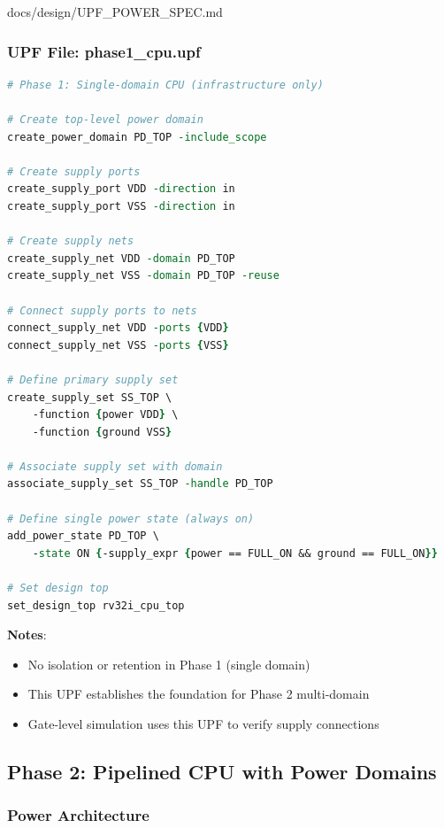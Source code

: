 \begin{relocated}{docs/design/UPF_POWER_SPEC.md}
\subsubsection{\texorpdfstring{UPF File:
phase1\_\allowbreak{}cpu.upf}{UPF File: phase1\_cpu.upf}}\label{ds:ch:upf-power-spec:upf-file-phase1-cpuupf}

\begin{lstlisting}[language=tcl]
# Phase 1: Single-domain CPU (infrastructure only)

# Create top-level power domain
create_power_domain PD_TOP -include_scope

# Create supply ports
create_supply_port VDD -direction in
create_supply_port VSS -direction in

# Create supply nets
create_supply_net VDD -domain PD_TOP
create_supply_net VSS -domain PD_TOP -reuse

# Connect supply ports to nets
connect_supply_net VDD -ports {VDD}
connect_supply_net VSS -ports {VSS}

# Define primary supply set
create_supply_set SS_TOP \
    -function {power VDD} \
    -function {ground VSS}

# Associate supply set with domain
associate_supply_set SS_TOP -handle PD_TOP

# Define single power state (always on)
add_power_state PD_TOP \
    -state ON {-supply_expr {power == FULL_ON && ground == FULL_ON}}

# Set design top
set_design_top rv32i_cpu_top
\end{lstlisting}

\textbf{Notes}:

\begin{itemize}
\tightlist
\item
  No isolation or retention in Phase 1 (single domain)
\item
  This UPF establishes the foundation for Phase 2 multi-domain
\item
  Gate-level simulation uses this UPF to verify supply connections
\end{itemize}

\subsection{Phase 2: Pipelined CPU with Power Domains}\label{ds:ch:upf-power-spec:phase-2-pipelined-cpu-with-power-domains}

\subsubsection{Power Architecture}\label{ds:ch:upf-power-spec:power-architecture-1}


\end{relocated}
